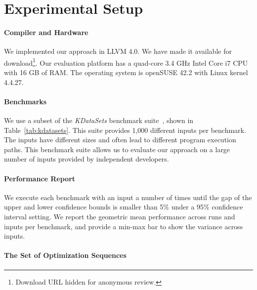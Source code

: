 \section{Experimental Setup}\label{sec:setup}

\paragraph{Compiler and Hardware} We implemented our approach in LLVM 4.0.
We have made it available for download\footnote{Download URL hidden for anonymous review.}.
Our evaluation platform has a quad-core 3.4 GHz Intel Core i7 CPU with 16 GB of RAM.
The operating system is openSUSE 42.2 with Linux kernel 4.4.27.


\paragraph{Benchmarks}
We use a subset of the \textit{KDataSets} benchmark suite~\cite{chen10,chen12a},
shown in Table~\ref{tab:kdatasets}.
This suite provides 1,000 different inputs per benchmark.
The inputs have different sizes and often lead to different program execution paths.
This benchmark suite allows us to evaluate our approach on a large number of inputs provided by independent
developers.





\paragraph{Performance Report}
We execute each benchmark with an input a number of times until the gap of the upper and lower confidence bounds is smaller than 5\% under
a 95\% confidence interval setting. We report the geometric mean performance across runs and inputs per benchmark, and provide a min-max
bar to show the variance across inputs.


\paragraph{The Set of Optimization Sequences}


